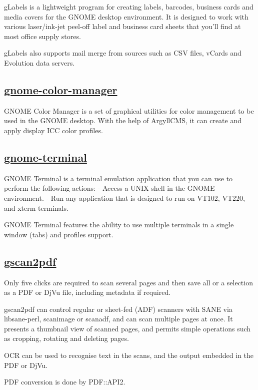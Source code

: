  gLabels is a lightweight program for creating labels, barcodes, business
 cards and media covers for the GNOME desktop environment. It is designed to
 work with various laser/ink-jet peel-off label and business card sheets that
 you'll find at most office supply stores.
 
 gLabels also supports mail merge from sources such as CSV files, vCards and
 Evolution data servers.

\subsection{\href{https://git.gnome.org/browse/gnome-color-manager}{gnome-color-manager}}

 GNOME Color Manager is a set of graphical utilities for color
 management to be used in the GNOME desktop.  With the help of
 ArgyllCMS, it can create and apply display ICC color profiles.

\subsection{\href{}{gnome-terminal}}

 GNOME Terminal is a terminal emulation application that you can use to
 perform the following actions:
  - Access a UNIX shell in the GNOME environment.
  - Run any application that is designed to run on VT102, VT220, and xterm
 terminals.
 
 GNOME Terminal features the ability to use multiple terminals in a single
 window (tabs) and profiles support.

\subsection{\href{http://gscan2pdf.sourceforge.net/}{gscan2pdf}}

 Only five clicks are required to scan several pages and then save all or a
 selection as a PDF or DjVu file, including metadata if required.
 
 gscan2pdf can control regular or sheet-fed (ADF) scanners with SANE via
 libsane-perl, scanimage or scanadf, and can scan multiple pages at once.
 It presents a thumbnail view of scanned pages, and permits simple operations
 such as cropping, rotating and deleting pages.
 
 OCR can be used to recognise text in the scans, and the output
 embedded in the PDF or DjVu.
 
 PDF conversion is done by PDF::API2.
 
